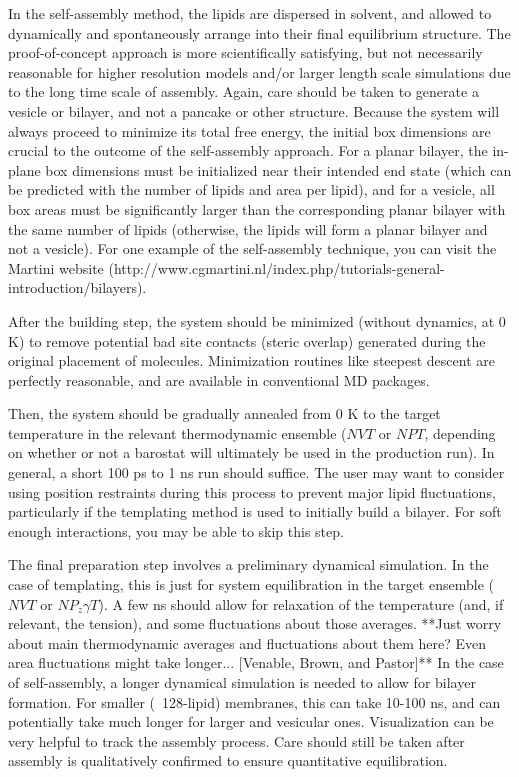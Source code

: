 \documentclass[9pt,bestpractices]{livecoms}
\begin{document}
In the self-assembly method, the lipids are dispersed in solvent, and allowed to dynamically and spontaneously arrange into their final equilibrium structure.
The proof-of-concept approach is more scientifically satisfying, but not necessarily reasonable for higher resolution models and/or larger length scale simulations due to the long time scale of assembly.
Again, care should be taken to generate a vesicle or bilayer, and not a pancake or other structure.
Because the system will always proceed to minimize its total free energy, the initial box dimensions are crucial to the outcome of the self-assembly approach.
For a planar bilayer, the in-plane box dimensions must be initialized near their intended end state (which can be predicted with the number of lipids and area per lipid), and for a vesicle, all box areas must be significantly larger than the corresponding planar bilayer with the same number of lipids (otherwise, the lipids will form a planar bilayer and not a vesicle).
For one example of the self-assembly technique, you can visit the Martini website (http://www.cgmartini.nl/index.php/tutorials-general-introduction/bilayers).

After the building step, the system should be minimized (without dynamics, at 0 K) to remove potential bad site contacts (steric overlap) generated during the original placement of molecules.
Minimization routines like steepest descent are perfectly reasonable, and are available in conventional MD packages.

Then, the system should be gradually annealed from 0 K to the target temperature in the relevant thermodynamic ensemble ($NVT$ or $NPT$, depending on whether or not a barostat will ultimately be used in the production run).
In general, a short 100 ps to 1 ns run should suffice.
The user may want to consider using position restraints during this process to prevent major lipid fluctuations, particularly if the templating method is used to initially build a bilayer.
For soft enough interactions, you may be able to skip this step.

The final preparation step involves a preliminary dynamical simulation.
In the case of templating, this is just for system equilibration in the target ensemble ($NVT$ or $NP_z \gamma T$).
A few ns should allow for relaxation of the temperature (and, if relevant, the tension), and some fluctuations about those averages.
**Just worry about main thermodynamic averages and fluctuations about them here? Even area fluctuations might take longer... [Venable, Brown, and Pastor]**
In the case of self-assembly, a longer dynamical simulation is needed to allow for bilayer formation.
For smaller (~128-lipid) membranes, this can take 10-100 ns, and can potentially take much longer for larger and vesicular ones.
Visualization can be very helpful to track the assembly process.
Care should still be taken after assembly is qualitatively confirmed to ensure quantitative equilibration.
\end{document}
